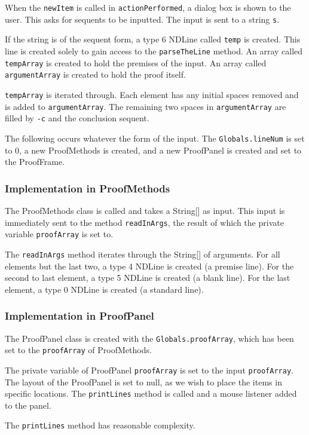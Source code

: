 \documentclass[a4paper]{article}
\begin{document}
When the \texttt{newItem} is called in \texttt{actionPerformed}, a dialog box is shown to the user. This asks for sequents to be inputted. The input is sent to a string \texttt{s}.

If the string is of the sequent form, a type 6 NDLine called \texttt{temp} is created. This line is created solely to gain access to the \texttt{parseTheLine} method. An array called \texttt{tempArray} is created to hold the premises of the input. An array called \texttt{argumentArray} is created to hold the proof itself.

\texttt{tempArray} is iterated through. Each element has any initial spaces removed and is added to \texttt{argumentArray}. The remaining two spaces in \texttt{argumentArray} are filled by \texttt{-c} and the conclusion sequent.

The following occurs whatever the form of the input. The \texttt{Globals.lineNum} is set to 0, a new ProofMethods is created, and a new ProofPanel is created and set to the ProofFrame.

\subsubsection{Implementation in ProofMethods}
The ProofMethods class is called and takes a String[] as input. This input is immediately sent to the method \texttt{readInArgs}, the result of which the private variable \texttt{proofArray} is set to.

The \texttt{readInArgs} method iterates through the String[] of arguments. For all elements but the last two, a type 4 NDLine is created (a premise line). For the second to last element, a type 5 NDLine is created (a blank line). For the last element, a type 0 NDLine is created (a standard line).

\subsubsection{Implementation in ProofPanel}
The ProofPanel class is created with the \texttt{Globals.proofArray}, which has been set to the \texttt{proofArray} of ProofMethods. 

The private variable of ProofPanel \texttt{proofArray} is set to the input \texttt{proofArray}. The layout of the ProofPanel is set to null, as we wish to place the items in specific locations. The \texttt{printLines} method is called and a mouse listener added to the panel.

The \texttt{printLines} method has reasonable complexity.
\end{document}
